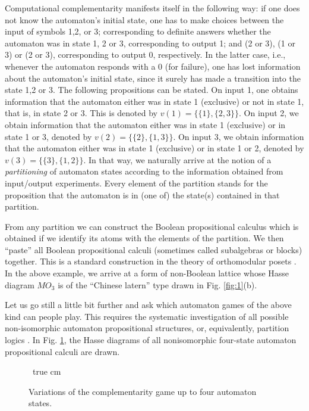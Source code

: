 Computational complementarity manifests itself in the following way: if
one does not know the automaton's initial state, one has to
make choices between the input of symbols
1,2, or 3;  corresponding to definite answers whether the automaton was
in state
1, 2 or 3, corresponding to
output 1; and (2 or 3), (1 or 3) or (2 or 3), corresponding to
output 0, respectively. In the latter case, i.e., whenever the
automaton
responds with a 0 (for failure), one has lost information about the
automaton's initial state, since it surely has made a transition into
the state
1,2 or 3.
The following propositions can be stated.
On input 1, one
obtains information that the automaton either was in state 1 (exclusive)
or not in state 1, that is, in state 2 or 3. This is
denoted by $v(1)=\{ \{1\},\{2,3\}\}$.
On input 2, we
obtain information that the automaton either was in state 1 (exclusive)
or in state 1 or 3,
denoted by $v(2)=\{ \{2\},\{1,3\}\}$.
On input 3, we
obtain information that the automaton either was in state 1 (exclusive)
or in state 1 or 2,
denoted by $v(3)=\{ \{3\},\{1,2\}\}$.
In that way, we naturally arrive at the notion of a {\em partitioning}
of automaton states according to the information obtained from
input/output
experiments. Every element of the partition stands for the proposition
that the automaton is in (one of) the state(s) contained in that
partition.

From any partition we can construct  the
Boolean
propositional calculus which is obtained if we identify its atoms
with the elements of the partition. We then
``paste'' all Boolean propositional calculi (sometimes called
subalgebras or blocks) together.
This is a standard construction in the theory of orthomodular posets
\cite{kalmbach,ptak,piziak,navara}.
In the above example,
we arrive at a form of non-Boolean lattice whose Hasse diagram
$MO_3$ is of the ``Chinese latern'' type drawn in Fig.
\ref{fig:1}(b).

Let us go still a little bit further and ask which automaton
games of the above kind can people play.
This requires the systematic investigation of all possible
non-isomorphic automaton propositional structures, or, equivalently,
partition logics  \cite{svozil-93,schasvo1,schasvo2}. In Fig.
\ref{fig:2}, the Hasse diagrams of all nonisomorphic four-state
automaton propositional calculi are drawn.
\begin{figure}
\begin{center}
$\,$
   true cm
\end{center}
\caption{Variations of the complementarity game up to four automaton
states. \label{fig:2}}
\end{figure}

